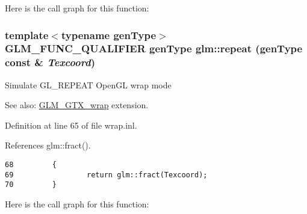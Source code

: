 Here is the call graph for this function:\hypertarget{group__gtx__wrap_g0e136d75883428ad7d9c19611290d77a}{
\subsubsection[repeat]{\setlength{\rightskip}{0pt plus 5cm}template$<$typename genType$>$ GLM\_\-FUNC\_\-QUALIFIER genType glm::repeat (genType const \& {\em Texcoord})}}
\label{group__gtx__wrap_g0e136d75883428ad7d9c19611290d77a}


Simulate GL\_\-REPEAT OpenGL wrap mode \begin{Desc}
\item[See also:]\hyperlink{group__gtx__wrap}{GLM\_\-GTX\_\-wrap} extension. \end{Desc}


Definition at line 65 of file wrap.inl.

References glm::fract().

\begin{Code}\begin{verbatim}68         {
69                 return glm::fract(Texcoord);
70         }
\end{verbatim}
\end{Code}




Here is the call graph for this function: